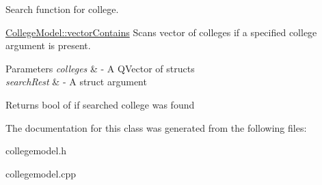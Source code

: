 Search function for college. 

\mbox{\hyperlink{class_college_model_a345c4e6868df90bed49e80b6783f5578}{College\+Model\+::vector\+Contains}} Scans vector of colleges if a specified college argument is present.


\begin{DoxyParams}{Parameters}
{\em colleges} & -\/ A Q\+Vector of structs \\
\hline
{\em search\+Rest} & -\/ A struct argument \\
\hline
\end{DoxyParams}
\begin{DoxyReturn}{Returns}
bool of if searched college was found 
\end{DoxyReturn}


The documentation for this class was generated from the following files\+:\begin{DoxyCompactItemize}
\item 
collegemodel.\+h\item 
collegemodel.\+cpp\end{DoxyCompactItemize}

